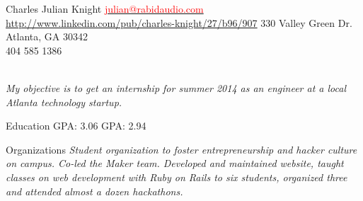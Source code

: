 \documentclass[a4paper,12pt]{article}
\begin{document}
\oddsidemargin=-1cm
\setmainfont

\header
{\LARGE{Charles Julian Knight}}
{{\hspace{.08in}\small \href{mailto:julian@rabidaudio.com}{\textcolor{red}{julian@rabidaudio.com}}}\\
\hspace{0in} \scriptsize \url{http://www.linkedin.com/pub/charles-knight/27/b96/907}}
{330 Valley Green Dr.\\Atlanta, GA 30342\\
{404 585 1386}\\ %
}\\
\begin{center}\footnotesize{\textit{My objective is to get an internship for summer 2014 as an engineer at a local Atlanta technology startup.}}\end{center}




\begin{resumeblockwider}{Education}
 \hspace{60px} GPA: 3.06
\largeskip
{} \hspace{66px} GPA: 2.94
\largeskip

\end{resumeblockwider}


\begin{resumeblock}{Organizations}
 \footnotesize{\textit{
Student organization to foster entrepreneurship and hacker culture on campus. Co-led the Maker team.
Developed and maintained website, taught classes on web development with Ruby on Rails to six students,
organized three and attended almost a dozen hackathons. }}

\end{resumeblock}
\end{document}
